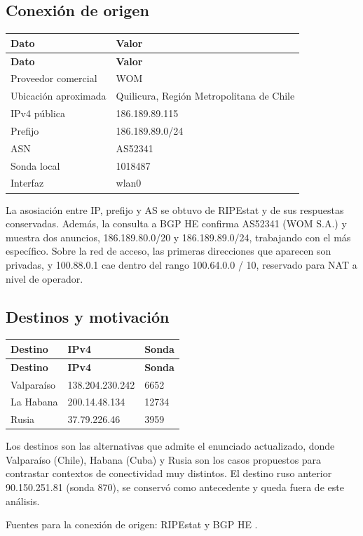 \subsection{Conexión de origen}
\begingroup
\fontsize{9}{11}\selectfont
\addtocounter{table}{-1}
\begin{longtable}{p{4.2cm}p{10.3cm}}
\toprule
\textbf{Dato} & \textbf{Valor} \\ \midrule
\endfirsthead
\toprule
\textbf{Dato} & \textbf{Valor} \\ \midrule
\endhead
Proveedor comercial & WOM \\
Ubicación aproximada & Quilicura, Región Metropolitana de Chile \\
IPv4 pública & 186.189.89.115 \\
Prefijo & 186.189.89.0/24 \\
ASN & AS52341 \\
Sonda local & 1018487 \\
Interfaz & wlan0 \\
\bottomrule
\end{longtable}
\endgroup

La asosiación entre IP, prefijo y AS se obtuvo de RIPEstat y de sus respuestas conservadas. Además, la consulta a BGP HE confirma AS52341 (WOM S.A.) y muestra dos anuncios, 186.189.80.0/20 y 186.189.89.0/24, trabajando con el más específico. Sobre la red de acceso, las primeras direcciones que aparecen son privadas, y 100.88.0.1 cae dentro del rango 100.64.0.0 / 10, reservado para NAT a nivel de operador. 


\subsection{Destinos y motivación}
\begingroup
\fontsize{9}{11}\selectfont
\addtocounter{table}{-1}
\begin{longtable}{p{3cm}p{6cm}p{3cm}}
\toprule
\textbf{Destino} & \textbf{IPv4} & \textbf{Sonda} \\ \midrule
\endfirsthead
\toprule
\textbf{Destino} & \textbf{IPv4} & \textbf{Sonda} \\ \midrule
\endhead
Valparaíso & 138.204.230.242 & 6652 \\
La Habana & 200.14.48.134 & 12734 \\
Rusia & 37.79.226.46 & 3959 \\
\bottomrule
\end{longtable}
\endgroup

Los destinos son las alternativas que admite el enunciado actualizado, donde Valparaíso (Chile), Habana (Cuba) y Rusia son los casos propuestos para contrastar contextos de conectividad muy distintos. El destino ruso anterior 90.150.251.81 (sonda 870), se conservó como antecedente y queda fuera de este análisis.

\noindent Fuentes para la conexión de origen: RIPEstat \cite{ref4} y BGP HE \cite{ref7}.
